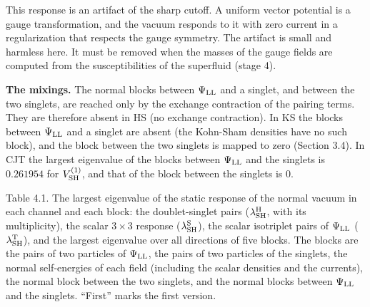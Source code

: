 \documentclass[
  10pt,
]{article}
\begin{document}
This response is an artifact of the sharp cutoff. A uniform vector
potential is a gauge transformation, and the vacuum responds to it with
zero current in a regularization that respects the gauge symmetry. The
artifact is small and harmless here. It must be removed when the masses
of the gauge fields are computed from the susceptibilities of the
superfluid (stage 4).

\textbf{The mixings.} The normal blocks between \(\Psi_{\rm LL}\) and a
singlet, and between the two singlets, are reached only by the exchange
contraction of the pairing terms. They are therefore absent in HS (no
exchange contraction). In KS the blocks between \(\Psi_{\rm LL}\) and a
singlet are absent (the Kohn-Sham densities have no such block), and the
block between the two singlets is mapped to zero (Section 3.4). In CJT
the largest eigenvalue of the blocks between \(\Psi_{\rm LL}\) and the
singlets is \(0.261954\) for \(V^{(1)}_{\rm SH}\), and that of the block
between the singlets is \(0\).

Table 4.1. The largest eigenvalue of the static response of the normal
vacuum in each channel and each block: the doublet-singlet pairs
(\(\lambda^{\rm H}_{\rm SH}\), with its multiplicity), the scalar
\(3\times3\) response (\(\lambda^{\rm S}_{\rm SH}\)), the scalar
isotriplet pairs of \(\Psi_{\rm LL}\) (\(\lambda^{\rm T}_{\rm SH}\)),
and the largest eigenvalue over all directions of five blocks. The
blocks are the pairs of two particles of \(\Psi_{\rm LL}\), the pairs of
two particles of the singlets, the normal self-energies of each field
(including the scalar densities and the currents), the normal block
between the two singlets, and the normal blocks between
\(\Psi_{\rm LL}\) and the singlets. ``First'' marks the first version.
\end{document}
